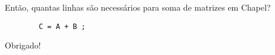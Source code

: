 \begin{frame}[fragile]
	\centering
	\LARGE{Então, quantas linhas são necessários para soma de matrizes em Chapel?}
	\vskip10mm
	\pause
	\begin{lstlisting}
		C = A + B ;
	\end{lstlisting}
\end{frame}

\begin{frame}
	\centering
	\LARGE{Obrigado!}
\end{frame}